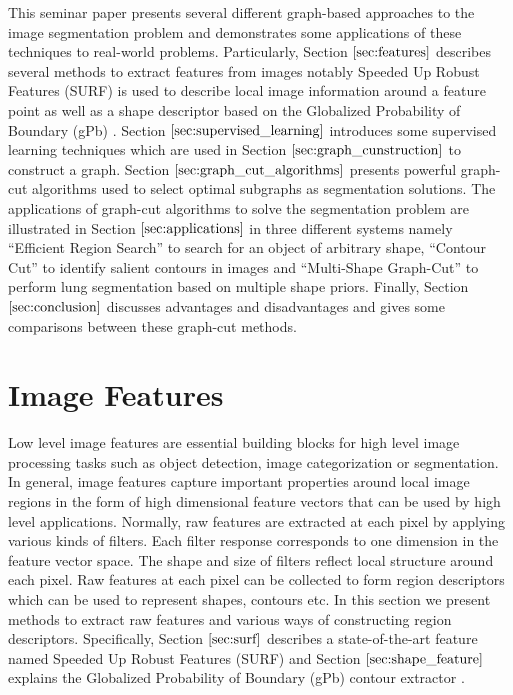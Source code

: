 \documentclass{SMBV12}
\begin{document}
This seminar paper presents several different graph-based approaches to the image segmentation problem and demonstrates some applications of these techniques to real-world problems. Particularly, Section $\ref{sec:features}$ describes several methods to extract features from images notably Speeded Up Robust Features (SURF) \cite{bay2006surf} is used to describe local image information around a feature point as well as a shape descriptor \cite{gu2009recognition} based on the Globalized Probability of Boundary (gPb) \cite{martin2004learning} \cite{maire2008using}. Section $\ref{sec:supervised_learning}$ introduces some supervised learning techniques which are used in Section $\ref{sec:graph_cunstruction}$ to construct a graph. Section $\ref{sec:graph_cut_algorithms}$ presents powerful graph-cut algorithms used to select optimal subgraphs as segmentation solutions. The applications of graph-cut algorithms to solve the segmentation problem are illustrated in Section $\ref{sec:applications}$ in three different systems namely ``Efficient Region Search'' \cite{VijayGrauman2011} to search for an object of arbitrary shape, ``Contour Cut'' \cite{KenGalShi2011} to identify salient contours in images and ``Multi-Shape Graph-Cut'' \cite{nakagomimulti} to perform lung segmentation based on multiple shape priors. Finally, Section $\ref{sec:conclusion}$ discusses advantages and disadvantages and gives some comparisons between these graph-cut methods.

%
\section{Image Features}
\label{sec:features}
Low level image features are essential building blocks for high level image processing tasks such as object detection, image categorization or segmentation. In general, image features capture important properties around local image regions in the form of high dimensional feature vectors that can be used by high level applications. Normally, raw features are extracted at each pixel by applying various kinds of filters. Each filter response corresponds to one dimension in the feature vector space. The shape and size of filters reflect local structure around each pixel. Raw features at each pixel can be collected to form region descriptors which can be used to represent shapes, contours etc. In this section we present methods to extract raw features and various ways of constructing region descriptors. Specifically, Section $\ref{sec:surf}$ describes a state-of-the-art feature named Speeded Up Robust Features (SURF) \cite{bay2006surf} and Section $\ref{sec:shape_feature}$ explains the Globalized Probability of Boundary (gPb) contour extractor \cite{maire2008using}.
\end{document}
